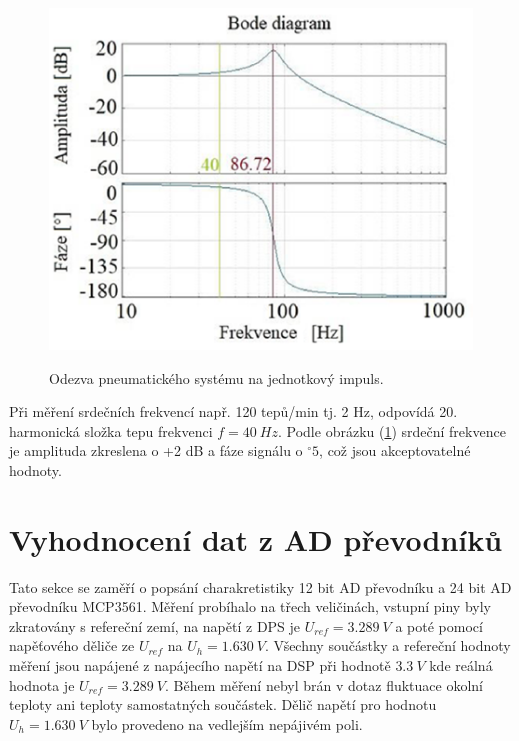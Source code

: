 \begin{figure}[H]
    \caption{Odezva pneumatického systému na jednotkový impuls.}
    \includegraphics[width=1\textwidth]{pictures/freq_char_pneu.png}
    \label{fig:pneu_freq_char}
\end{figure}
Při měření srdečních frekvencí např. 120 tepů/min tj. 2 Hz, odpovídá 20. harmonická složka tepu frekvenci $f = 40 \ Hz$. Podle obrázku (\ref{fig:pneu_freq_char}) srdeční frekvence je amplituda zkreslena o +2 dB a fáze signálu o $^\circ 5$, což jsou akceptovatelné hodnoty.

%
%
%
%
\section{Vyhodnocení dat z AD převodníků}
Tato sekce se zaměří o popsání charakretistiky 12 bit AD převodníku a 24 bit AD převodníku MCP3561. Měření probíhalo na třech veličinách, vstupní piny byly zkratovány s refereční zemí, na napětí z DPS je $U_{ref} = 3.289 \ V$ a poté pomocí napěťového děliče ze $U_{ref}$ na $U_{h} = 1.630 \ V$.
Všechny součástky a refereční hodnoty měření jsou napájené z napájecího napětí na DSP při hodnotě $3.3 \ V$ kde reálná hodnota je $U_{ref} = 3.289 \ V$. Během měření nebyl brán v dotaz fluktuace okolní teploty ani teploty samostatných součástek. Dělič napětí pro hodnotu $U_{h} = 1.630 \ V$ bylo provedeno na vedlejším nepájivém poli.

